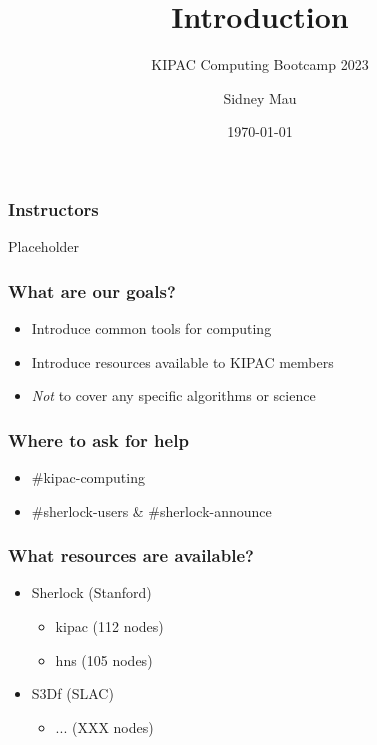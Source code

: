 \documentclass[aspectratio=169]{beamer}
\title{Introduction}
\subtitle{KIPAC Computing Bootcamp 2023}
\author[S. Mau]{Sidney Mau}
\institute[Stanford]{Stanford University}
\date[\today]{\today}
\begin{document}

\frame{\titlepage}



% 


\begin{frame}
	\frametitle{Instructors}
	Placeholder
\end{frame}

\begin{frame}
	\frametitle{What are our goals?}
	\begin{itemize}
		\item Introduce common tools for computing
		\item Introduce resources available to KIPAC members
		\item \emph{Not} to cover any specific algorithms or science
	\end{itemize}
\end{frame}

\begin{frame}
	\frametitle{Where to ask for help}
	\begin{itemize}
		\item \#kipac-computing
		\item \#sherlock-users \& \#sherlock-announce
	\end{itemize}
\end{frame}

\begin{frame}
	\frametitle{What resources are available?}
	\begin{itemize}
		\item Sherlock (Stanford)
			\begin{itemize}
				\item kipac (112 nodes)
				\item hns (105 nodes)
			\end{itemize}
		\item S3Df (SLAC)
			\begin{itemize}
				\item ... (XXX nodes)
			\end{itemize}
	\end{itemize}
\end{frame}
\end{document}
